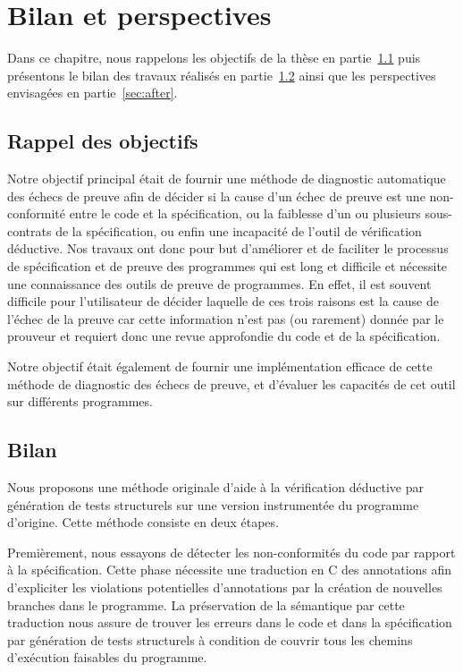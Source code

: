 
\chapter{Bilan et perspectives}
\label{sec:end}


Dans ce chapitre, nous rappelons les objectifs de la thèse en
partie~\ref{sec:obj} puis présentons le bilan des travaux réalisés en
partie~\ref{sec:bilan} ainsi que les perspectives envisagées en
partie~\ref{sec:after}.


\section{Rappel des objectifs}
\label{sec:obj}


Notre objectif principal était de fournir une méthode de diagnostic automatique
des échecs de preuve afin de décider si la cause d'un échec de preuve est une
non-conformité entre le code et la spécification, ou la faiblesse d'un ou
plusieurs sous-contrats de la spécification, ou enfin une incapacité de l'outil
de vérification déductive.
Nos travaux ont donc pour but d'améliorer et de faciliter le processus de
spécification et de preuve des programmes qui est long et difficile et nécessite
une connaissance des outils de preuve de programmes.
En effet, il est souvent difficile pour l'utilisateur de décider laquelle de ces
trois raisons est la cause de l'échec de la preuve car cette information n'est
pas (ou rarement) donnée par le prouveur et requiert donc une revue approfondie
du code et de la spécification.

Notre objectif était également de fournir une implémentation efficace de cette
méthode de diagnostic des échecs de preuve, et d'évaluer les capacités de cet
outil sur différents programmes.


\section{Bilan}
\label{sec:bilan}


Nous proposons une méthode originale d'aide à la vérification déductive par
génération de tests structurels sur une version instrumentée du programme
d'origine.
Cette méthode consiste en deux étapes.

Premièrement, nous essayons de détecter les non-conformités du code par
rapport à la spécification.
Cette phase nécessite une traduction en C des annotations \acsl afin
d'expliciter les violations potentielles d'annotations par la création de
nouvelles branches dans le programme.
La préservation de la sémantique par cette traduction nous assure de trouver
les erreurs dans le code et dans la spécification par génération de tests
structurels à condition de couvrir tous les chemins d'exécution faisables du
programme.

